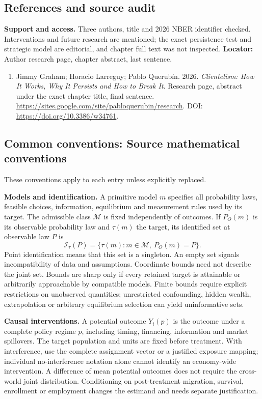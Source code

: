\documentclass[11pt,a4paper]{article}
\begin{document}
\subsection*{References and source audit}
\textbf{Support and access.} Three authors, title and 2026 NBER identifier checked. Interventions and future research are mentioned; the exact persistence test and strategic model are editorial, and chapter full text was not inspected. \textbf{Locator:} Author research page, chapter abstract, last sentence.
\begin{enumerate}\raggedright
\item\hypertarget{definitions:source:30007666:1}{} Jimmy Graham; Horacio Larreguy; Pablo Querubín. 2026. \emph{Clientelism: How It Works, Why It Persists and How to Break It}. Research page, abstract under the exact chapter title, final sentence.
\url{https://sites.google.com/site/pabloquerubin/research}.
DOI: \url{https://doi.org/10.3386/w34761}.
\end{enumerate}

\subsection*{Common conventions: Source mathematical conventions}

These conventions apply to each entry unless explicitly replaced.

\textbf{Models and identification.} A primitive model \(m\) specifies all probability laws, feasible choices, information, equilibrium and measurement rules used by its target. The admissible class \(\mathcal M\) is fixed independently of outcomes. If \(P_O(m)\) is its observable probability law and \(\tau(m)\) the target, its identified set at observable law \(P\) is
\[
 \mathcal I_\tau(P)=\{\tau(m):m\in\mathcal M,\ P_O(m)=P\}.
\]
Point identification means that this set is a singleton. An empty set signals incompatibility of data and assumptions. Coordinate bounds need not describe the joint set. Bounds are sharp only if every retained target is attainable or arbitrarily approachable by compatible models. Finite bounds require explicit restrictions on unobserved quantities; unrestricted confounding, hidden wealth, extrapolation or arbitrary equilibrium selection can yield uninformative sets.

\textbf{Causal interventions.} A potential outcome \(Y_i(p)\) is the outcome under a complete policy regime \(p\), including timing, financing, information and market spillovers. The target population and units are fixed before treatment. With interference, use the complete assignment vector or a justified exposure mapping; individual no-interference notation alone cannot identify an economy-wide intervention. A difference of mean potential outcomes does not require the cross-world joint distribution. Conditioning on post-treatment migration, survival, enrollment or employment changes the estimand and needs separate justification.
\end{document}
